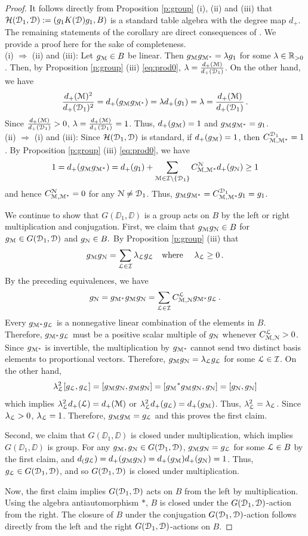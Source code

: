 \documentclass{amsart}
\begin{document}
\begin{proof}
It follows directly from Proposition \ref{p:group} (i), (ii) and (iii) that $\HH(\DD_1, \DD):=(g_1 \KD g_1, B)$ is a standard table algebra with the degree map $d_+$. The remaining statements of the corollary are direct consequences of \cite[Prop. 3.18 and 3.19]{Bl}. We provide a proof here for the sake of completeness. \\
(i) $\Rightarrow$ (ii) and (iii): Let $\gm \in B$ be linear. Then $\gm \gmd = \ld g_1$ for some $\ld \in \BRp$. Then, by Proposition \ref{p:group} (iii) \eqref{eq:prod0}, $\ld = \frac{d_+(\MM)}{d_+(\DD_1)}$. On the other hand, we have
$$
\frac{d_+(\MM)^2}{d_+(\DD_1)^2} = d_+(\gm \gmd) = \ld d_+(g_1) = \ld = \frac{d_+(\MM)}{d_+(\DD_1)}\,.
$$
Since $\frac{d_+(\MM)}{d_+(\DD_1)} > 0$, $\ld = \frac{d_+(\MM)}{d_+(\DD_1)}=1$. Thus, $d_+(\gm)=1$ and $\gm\gmd=g_1$. \\
(ii) $\Rightarrow$ (i) and (iii): Since $\HH(\DD_1, \DD)$ is standard, if $d_+(\gm)=1$, then $C_{\MM, \MM^*}^{\DD_1} =1$. By Proposition \ref{p:group} (iii) \eqref{eq:prod0}, we have 
$$
1=d_+(\gm \gmd) =  d_+(g_1) +\sum_{\MM \in \I\setminus\{\DD_1\}} C_{\MM, \MM^*}^{\NN} d_+(\gn) \ge 1
$$
and hence $C_{\MM, \MM^*}^{\NN} =0$ for any $\NN \ne \DD_1$. Thus, $\gm \gmd = C_{\MM, \MM^*}^{\DD_1} g_1 = g_1$.

We continue to show that $G(\DD_1, \DD)$ is a group acts on $B$ by the left or right multiplication and conjugation. First, we  claim that $\gm \gn \in B$ for $\gm \in G(\DD_1, \DD)$ and $\gn \in B.$ By Proposition \ref{p:group} (iii) that
$$
\gm \gn = \sum_{\LL \in \I}\ld_\LL \gl \quad\text{where }\quad \ld_\LL \ge 0\,.
$$
By the preceding equivalences, we have
$$
\gn = \gmd\gm\gn = \sum_{\LL \in \I} C_{\MM, \NN}^\LL \gmd\gl\,.
$$
Every $\gmd\gl$ is a nonnegative linear combination of the elements in $B$. Therefore, $\gmd\gl$ must be a positive scalar multiple of $\gn$ whenever  $C_{\MM, \NN}^\LL > 0$. Since $\gmd$ is invertible,  the multiplication by $\gmd$ cannot send two distinct basis elements to proportional vectors. Therefore, $\gm \gn = \ld_\LL \gl$ for some $\LL \in \I$. On the other hand,
$$
\ld_\LL^2 [\gl, \gl] = [\gm \gn, \gm \gn] = [\gm^* \gm \gn,  \gn] = [\gn,  \gn]
$$
which implies $\ld_\LL^2 d_+(\LL) = d_+(\MM)$ or  $\ld_\LL^2 d_+(\gl) = d_+(\gm)$. Thus, $\ld_\LL^2 = \ld_\LL$. Since $\ld_\LL > 0$, $\ld_\LL=1$. Therefore, $\gm \gm = \gl$ and this proves the first claim. 

Second, we claim that $G(\DD_1, \DD)$ is closed under multiplication, which implies $G(\DD_1, \DD)$ is group. For any $\gm, \gn \in \GD$,
$\gm\gn = \gl$ for some $\LL \in B$ by the first claim, and $d_(\gl) = d_+(\gm \gn) =d_+(\gm) d_+(\gn) = 1$. Thus, $\gl \in \GD$, and so $\GD$ is closed under multiplication.

Now, the first claim implies $\GD$ acts on $B$ from the left by multiplication. Using the algebra antiautomorphism $*$, $B$ is closed under the $\GD$-action from the right. The closure of $B$ under the conjugation $\GD$-action follows directly from the left and the right $\GD$-actions on $B$.
\end{proof}
\end{document}
